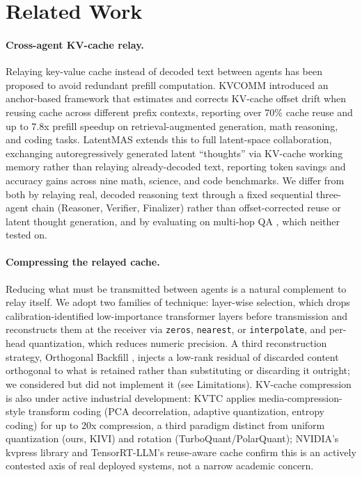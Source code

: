 \documentclass[11pt]{article}
\begin{document}
\section{Related Work}
\label{sec:related}

\paragraph{Cross-agent KV-cache relay.} Relaying key-value cache instead
of decoded text between agents has been proposed to avoid redundant
prefill computation. KVCOMM \citep{kvcomm2025} introduced an anchor-based
framework that estimates and corrects KV-cache offset drift when reusing
cache across different prefix contexts, reporting over 70\% cache reuse
and up to 7.8x prefill speedup on retrieval-augmented generation, math
reasoning, and coding tasks. LatentMAS \citep{latentmas2026} extends this
to full latent-space collaboration, exchanging autoregressively generated
latent ``thoughts'' via KV-cache working memory rather than relaying
already-decoded text, reporting token savings and accuracy gains across
nine math, science, and code benchmarks. We differ from both by relaying
real, decoded reasoning text through a fixed sequential three-agent chain
(Reasoner, Verifier, Finalizer) rather than offset-corrected reuse or
latent thought generation, and by evaluating on multi-hop QA
\citep{hotpotqa2018}, which neither tested on.

\paragraph{Compressing the relayed cache.} Reducing what must be
transmitted between agents is a natural complement to relay itself. We
adopt two families of technique: layer-wise selection, which drops
calibration-identified low-importance transformer layers before
transmission and reconstructs them at the receiver via \texttt{zeros},
\texttt{nearest}, or \texttt{interpolate}, and per-head quantization,
which reduces numeric precision. A third reconstruction strategy,
Orthogonal Backfill \citep{orthobackfill2026}, injects a low-rank residual
of discarded content orthogonal to what is retained rather than
substituting or discarding it outright; we considered but did not
implement it (see Limitations). KV-cache compression is also under active
industrial development: KVTC \citep{kvtc2026} applies media-compression-
style transform coding (PCA decorrelation, adaptive quantization, entropy
coding) for up to 20x compression, a third paradigm distinct from uniform
quantization (ours, KIVI) and rotation (TurboQuant/PolarQuant); NVIDIA's
kvpress library and TensorRT-LLM's reuse-aware cache confirm this is an
actively contested axis of real deployed systems, not a narrow academic
concern.
\end{document}
